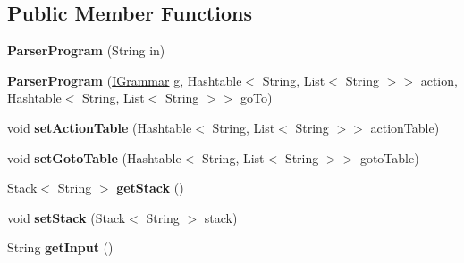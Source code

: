 \subsection*{Public Member Functions}
\begin{DoxyCompactItemize}
\item 
\hypertarget{classparser_program_1_1_parser_program_a75809e27c5f5fd3b28863c17024c78a6}{{\bfseries Parser\-Program} (String in)}\label{classparser_program_1_1_parser_program_a75809e27c5f5fd3b28863c17024c78a6}

\item 
\hypertarget{classparser_program_1_1_parser_program_a00bd1a89b976e04b3e3ed022093a3664}{{\bfseries Parser\-Program} (\hyperlink{interfacecontext_free_1_1grammar_1_1_i_grammar}{I\-Grammar} g, Hashtable$<$ String, List$<$ String $>$$>$ action, Hashtable$<$ String, List$<$ String $>$$>$ go\-To)}\label{classparser_program_1_1_parser_program_a00bd1a89b976e04b3e3ed022093a3664}

\item 
\hypertarget{classparser_program_1_1_parser_program_a85c97b5518ccedd3cfeae357e8ed28e2}{void {\bfseries set\-Action\-Table} (Hashtable$<$ String, List$<$ String $>$$>$ action\-Table)}\label{classparser_program_1_1_parser_program_a85c97b5518ccedd3cfeae357e8ed28e2}

\item 
\hypertarget{classparser_program_1_1_parser_program_a157523a0c4a59471b6194e5868840b7f}{void {\bfseries set\-Goto\-Table} (Hashtable$<$ String, List$<$ String $>$$>$ goto\-Table)}\label{classparser_program_1_1_parser_program_a157523a0c4a59471b6194e5868840b7f}

\item 
\hypertarget{classparser_program_1_1_parser_program_a89685a1ddaa7fe03516ab89efeffa1bf}{Stack$<$ String $>$ {\bfseries get\-Stack} ()}\label{classparser_program_1_1_parser_program_a89685a1ddaa7fe03516ab89efeffa1bf}

\item 
\hypertarget{classparser_program_1_1_parser_program_aeae5ec3cce4e823ada43a40403a84edd}{void {\bfseries set\-Stack} (Stack$<$ String $>$ stack)}\label{classparser_program_1_1_parser_program_aeae5ec3cce4e823ada43a40403a84edd}

\item 
\hypertarget{classparser_program_1_1_parser_program_af5f3b504a20607ba94a8e3a1cb7e39b4}{String {\bfseries get\-Input} ()}\label{classparser_program_1_1_parser_program_af5f3b504a20607ba94a8e3a1cb7e39b4}


\end{DoxyCompactItemize}
